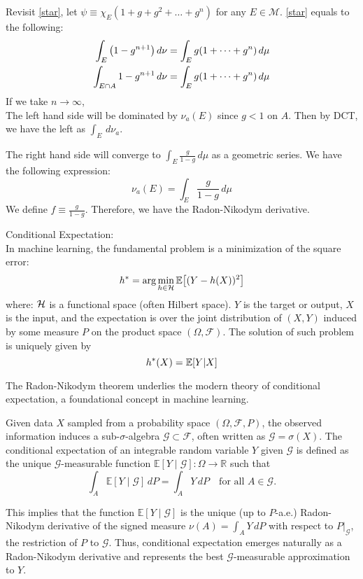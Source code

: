 \begin{prf}
Revisit \eqref{star}, let $\psi \equiv \chi_E(1+g+g^2+\dots + g^n)$ for any $E\in \mathcal M$. \eqref{star} equals to the following:  
\begin{align*}
	\int_E\qty(1-g^{n+1})\, d\nu &= \int_E g\qty(1+\dots + g^n)\, d\mu\\
	\int_{E\cap A} 1-g^{n+1}\, d\nu &= \int_E  g\qty(1+\dots + g^n)\, d\mu
\end{align*}
If we take $n\to \infty$, \\

The left hand side will be dominated by $\nu_a(E)$ since $g<1$ on $A$. Then by DCT, we have the left as $\int_E \, d\nu_a$. 

The right hand side will converge to $\int_E \frac{g}{1-g}\, d\mu$ as a geometric series. We have the following expression: 
$$\nu_a(E) = \int_E \frac{g}{1-g} \, d\mu$$
We define $f\equiv \frac{g}{1-g}$. Therefore, we have the Radon-Nikodym derivative. 

\end{prf}


\begin{rmk}{Conditional Expectation:}\\
In machine learning, the fundamental problem is a minimization of the square error: 
$$h^* = \arg\min_{h \in {\mathcal{H}}} \mathbb{E}\qty[(Y-h(X))^2]$$
where:
${\mathcal{H}}$ is a functional space (often Hilbert space). $Y$ is the target or output, $X$ is the input, and the expectation is over the joint distribution of $(X, Y)$ induced by some measure $P$ on the product space $(\Omega, \mathcal{F})$. The solution of such problem is uniquely given by
$$h^*(X) = \mathbb{E}[Y|X]$$

The Radon-Nikodym theorem underlies the modern theory of conditional expectation, a foundational concept in machine learning. 

Given data \( X \) sampled from a probability space \( (\Omega, \mathcal{F}, P) \), the observed information induces a sub-\(\sigma\)-algebra \( \mathcal{G} \subset \mathcal{F} \), often written as \( \mathcal{G} = \sigma(X) \). The conditional expectation of an integrable random variable \( Y \) given \( \mathcal{G} \) is defined as the unique \( \mathcal{G} \)-measurable function \( \mathbb{E}[Y \mid \mathcal{G}] : \Omega \to \mathbb{R} \) such that
\[
\int_A \mathbb{E}[Y \mid \mathcal{G}] \, dP = \int_A Y \, dP \quad \text{for all } A \in \mathcal{G}.
\]

This implies that the function \( \mathbb{E}[Y \mid \mathcal{G}] \) is the unique (up to $P$-a.e.) Radon-Nikodym derivative of the signed measure \( \nu(A) = \int_A Y \, dP \) with respect to \( P|_{\mathcal{G}} \), the restriction of \( P \) to \( \mathcal{G} \). Thus, conditional expectation emerges naturally as a Radon-Nikodym derivative and represents the best \( \mathcal{G} \)-measurable approximation to \( Y \).
\end{rmk}
 
 


